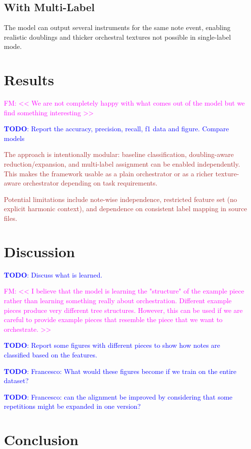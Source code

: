 \documentclass{aimc2026}
\newcommand{\todo}[1]{\textcolor{blue}{\textbf{TODO}: #1}}
\newcommand{\fm}[1]{\textcolor{magenta}{FM: << #1 >>}}
\newcommand{\draft}[1]{\textcolor{brown}{#1}}
\begin{document}
\subsection{With Multi-Label}
The model can output several instruments for the same note event, enabling realistic doublings and thicker orchestral textures not possible in single-label mode.


\section{Results}

\fm{We are not completely happy with what comes out of the model but we find something interesting}

\todo{Report the accuracy, precision, recall, f1 data and figure. Compare models}

\draft{The approach is intentionally modular: baseline classification, doubling-aware reduction/expansion, and multi-label assignment can be enabled independently. This makes the framework usable as a plain orchestrator or as a richer texture-aware orchestrator depending on task requirements.
}

\draft{
Potential limitations include note-wise independence, restricted feature set (no explicit harmonic context), and dependence on consistent label mapping in source files.
}

\section{Discussion}

\todo{Discuss what is learned.}

\fm{I believe that the model is learning the "structure" of the example piece rather than learning something really about orchestration. Different example pieces produce very different tree structures. However, this can be used if we are careful to provide example pieces that resemble the piece that we want to orchestrate.}

\todo{Report some figures with different pieces to show how notes are classified based on the features.}

\todo{Francesco: What would these figures become if we train on the entire dataset?}

\todo{Francesco: can the alignment be improved by considering that some repetitions might be expanded in one version?}

\section{Conclusion}
\end{document}
